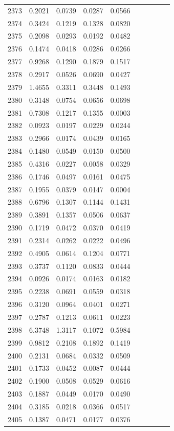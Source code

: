 \begin{table}
\begin{tabular}{cccccccccc}
2373& 0.2021& 0.0739& 0.0287& 0.0566\\ 
2374& 0.3424& 0.1219& 0.1328& 0.0820\\ 
2375& 0.2098& 0.0293& 0.0192& 0.0482\\ 
2376& 0.1474& 0.0418& 0.0286& 0.0266\\ 
2377& 0.9268& 0.1290& 0.1879& 0.1517\\ 
2378& 0.2917& 0.0526& 0.0690& 0.0427\\ 
2379& 1.4655& 0.3311& 0.3448& 0.1493\\ 
2380& 0.3148& 0.0754& 0.0656& 0.0698\\ 
2381& 0.7308& 0.1217& 0.1355& 0.0003\\ 
2382& 0.0923& 0.0197& 0.0229& 0.0244\\ 
2383& 0.2966& 0.0174& 0.0439& 0.0165\\ 
2384& 0.1480& 0.0549& 0.0150& 0.0500\\ 
2385& 0.4316& 0.0227& 0.0058& 0.0329\\ 
2386& 0.1746& 0.0497& 0.0161& 0.0475\\ 
2387& 0.1955& 0.0379& 0.0147& 0.0004\\ 
2388& 0.6796& 0.1307& 0.1144& 0.1431\\ 
2389& 0.3891& 0.1357& 0.0506& 0.0637\\ 
2390& 0.1719& 0.0472& 0.0370& 0.0419\\ 
2391& 0.2314& 0.0262& 0.0222& 0.0496\\ 
2392& 0.4905& 0.0614& 0.1204& 0.0771\\ 
2393& 0.3737& 0.1120& 0.0833& 0.0444\\ 
2394& 0.0926& 0.0174& 0.0163& 0.0182\\ 
2395& 0.2238& 0.0691& 0.0559& 0.0318\\ 
2396& 0.3120& 0.0964& 0.0401& 0.0271\\ 
2397& 0.2787& 0.1213& 0.0611& 0.0223\\ 
2398& 6.3748& 1.3117& 0.1072& 0.5984\\ 
2399& 0.9812& 0.2108& 0.1892& 0.1419\\ 
2400& 0.2131& 0.0684& 0.0332& 0.0509\\ 
2401& 0.1733& 0.0452& 0.0087& 0.0444\\ 
2402& 0.1900& 0.0508& 0.0529& 0.0616\\ 
2403& 0.1887& 0.0449& 0.0170& 0.0490\\ 
2404& 0.3185& 0.0218& 0.0366& 0.0517\\ 
2405& 0.1387& 0.0471& 0.0177& 0.0376\\ 

\end{tabular}
\end{table}
